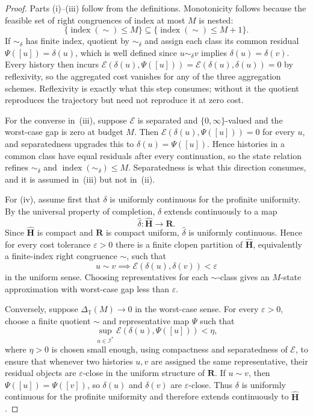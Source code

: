 \documentclass[12pt]{article}
\theoremstyle{definition}
\begin{document}
\begin{proof}
Parts (i)--(iii) follow from the definitions.  Monotonicity follows because
the feasible set of right congruences of index at most $M$ is nested:
\[
\{\operatorname{index}(\sim)\le M\}
\subseteq
\{\operatorname{index}(\sim)\le M+1\}.
\]
If $\sim_\delta$ has finite index, quotient by $\sim_\delta$ and assign each
class its common residual $\Psi([u])=\delta(u)$, which is well defined since
$u\sim_\delta v$ implies $\delta(u)=\delta(v)$.  Every history then incurs
$\mathcal E(\delta(u),\Psi([u]))=\mathcal E(\delta(u),\delta(u))=0$ by
reflexivity, so the aggregated cost vanishes for any of the three aggregation
schemes.  Reflexivity is exactly what this step consumes; without it the
quotient reproduces the trajectory but need not reproduce it at zero cost.

For the converse in~(iii), suppose $\mathcal E$ is separated and
$\{0,\infty\}$-valued and the worst-case gap is zero at budget $M$.  Then
$\mathcal E(\delta(u),\Psi([u]))=0$ for every $u$, and separatedness upgrades
this to $\delta(u)=\Psi([u])$.  Hence histories in a common class have equal
residuals after every continuation, so the state relation refines
$\sim_\delta$ and $\operatorname{index}(\sim_\delta)\le M$.  Separatedness is
what this direction consumes, and it is assumed in~(iii) but not in~(ii).

For (iv), assume first that $\delta$ is uniformly continuous for the profinite
uniformity.  By the universal property of completion, $\delta$ extends
continuously to a map
\[
\widehat\delta:\widehat{\mathbf H}\to\mathbf R.
\]
Since $\widehat{\mathbf H}$ is compact and $\mathbf R$ is compact uniform,
$\widehat\delta$ is uniformly continuous.  Hence for every cost tolerance
$\varepsilon>0$ there is a finite clopen partition of $\widehat{\mathbf H}$,
equivalently a finite-index right congruence $\sim$, such that
\[
u\sim v
\implies
\mathcal E(\delta(u),\delta(v))<\varepsilon
\]
in the uniform sense.  Choosing representatives for each $\sim$-class gives an
$M$-state approximation with worst-case gap less than $\varepsilon$.

Conversely, suppose $\Delta_{\mathbb T}(M)\to0$ in the worst-case sense.  For
every $\varepsilon>0$, choose a finite quotient $\sim$ and representative map
$\Psi$ such that
\[
\sup_{u\in\mathcal I^*}
\mathcal E(\delta(u),\Psi([u]))
<
\eta,
\]
where $\eta>0$ is chosen small enough, using compactness and separatedness of
$\mathcal E$, to ensure that whenever two histories $u,v$ are assigned the same
representative, their residual objects are $\varepsilon$-close in the uniform
structure of $\mathbf R$.  If $u\sim v$, then $\Psi([u])=\Psi([v])$, so
$\delta(u)$ and $\delta(v)$ are $\varepsilon$-close.  Thus $\delta$ is
uniformly continuous for the profinite uniformity and therefore extends
continuously to $\widehat{\mathbf H}$.
\end{proof}
\end{document}

